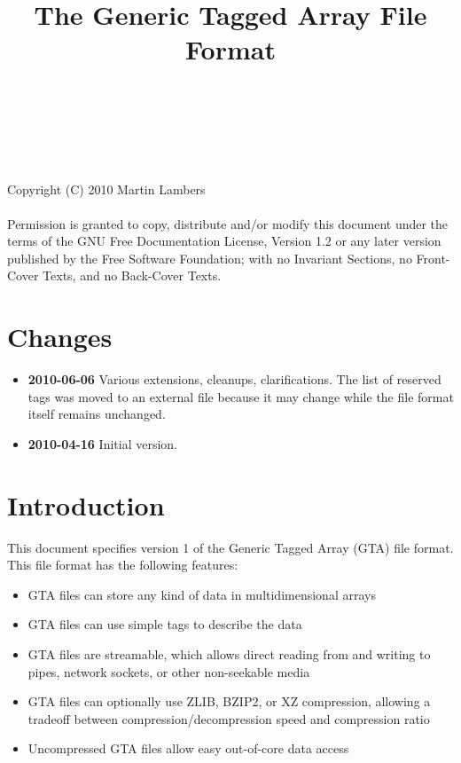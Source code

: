 \documentclass[a4paper,11pt]{article}
\begin{document}
\title{The Generic Tagged Array File Format}
\author{~}
\date{~}
\maketitle

\noindent
{\scriptsize
Copyright (C) 2010 Martin Lambers\\~\\
Permission is granted to copy, distribute and/or modify this document
under the terms of the GNU Free Documentation License, Version 1.2 or
any later version published by the Free Software Foundation; with no
Invariant Sections, no Front-Cover Texts, and no Back-Cover Texts.
}


{}
\section*{Changes}

\begin{itemize}
\item \textbf{2010-06-06} Various extensions, cleanups, clarifications.
The list of reserved tags was moved to an external file because it may change
while the file format itself remains unchanged.
\item \textbf{2010-04-16} Initial version.
\end{itemize}


{}
\section*{Introduction}

This document specifies version 1 of the Generic Tagged Array (GTA) file format.
This file format has the following features:
\begin{itemize}
\item GTA files can store any kind of data in multidimensional arrays
\item GTA files can use simple tags to describe the data
\item GTA files are streamable, which allows direct reading from and
	writing to pipes, network sockets, or other non-seekable media
\item GTA files can optionally use ZLIB, BZIP2, or XZ compression,
	allowing a tradeoff between compression/decompression speed and
	compression ratio
\item Uncompressed GTA files allow easy out-of-core data access
\end{itemize}
\end{document}
